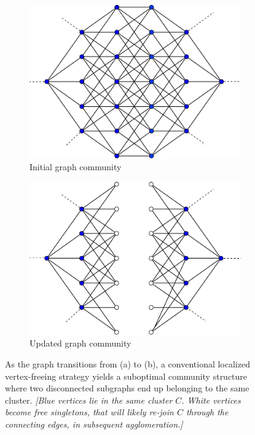 \documentclass[conference]{IEEEtran}
\begin{document}
\begin{figure}
\begin{subfigure}{0.45\textwidth}
\includegraphics[width=\linewidth]{graph.pdf}
\caption{Initial graph community} \label{graph_init}
\end{subfigure}
\raisebox{8pt}{$\boldsymbol{\rightarrow}$}
\begin{subfigure}{0.45\textwidth}
\includegraphics[width=\linewidth]{graph_split.pdf}
\caption{Updated graph community} \label{graph_split}
\end{subfigure}
\caption{\label{graph} As the graph transitions from (a) to (b), a conventional 
localized vertex-freeing strategy yields a suboptimal community structure where 
two disconnected subgraphs end up belonging to the same cluster. \emph{[Blue 
vertices lie in the same cluster $C$. White vertices become free 
singletons, that will likely re-join $C$ through the connecting edges, in 
subsequent agglomeration.]}\vspace{-0.5cm}}
\vspace{-0.2cm}
\end{figure}
\end{document}
